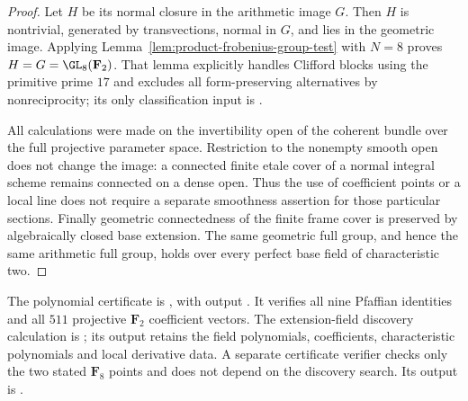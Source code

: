 \begin{proof}
Let $H$ be its normal closure in the arithmetic image $G$.
Then $H$ is nontrivial, generated by transvections, normal in $G$,
and lies in the geometric image. Applying
Lemma~\ref{lem:product-frobenius-group-test} with $N=8$ proves
$H=G=\GL_8(\mathbf F_2)$. That lemma explicitly handles Clifford
blocks using the primitive prime $17$ and excludes all form-preserving
alternatives by nonreciprocity; its only classification input is
\cite[Theorem~3.6, printed p.~22]{KantorSeress2001}.

All calculations were made on the invertibility open of the coherent
bundle over the full projective parameter space. Restriction to the
nonempty smooth open does not change the image: a connected finite
etale cover of a normal integral scheme remains connected on a
dense open. Thus the use of coefficient points or a local line does
not require a separate smoothness assertion for those particular
sections. Finally geometric connectedness of the finite frame cover
is preserved by algebraically closed base extension. The same
geometric full group, and hence the same arithmetic full group, holds
over every perfect base field of characteristic two.
\end{proof}

\begin{remark}
The polynomial certificate is
, with
output .
It verifies all nine Pfaffian identities and all $511$ projective
$\mathbf F_2$ coefficient vectors. The extension-field discovery
calculation is
;
its output retains the field polynomials, coefficients, characteristic
polynomials and local derivative data. A separate certificate verifier
checks only the two stated $\mathbf F_8$ points and does not depend
on the discovery search. Its output is
.
\end{remark}
